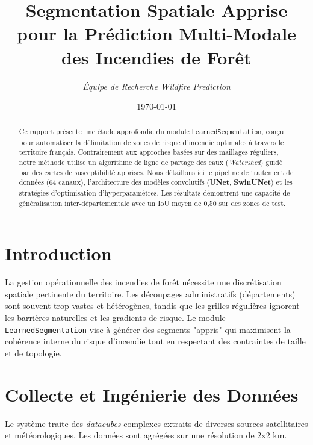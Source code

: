 \documentclass[11pt,a4paper]{article}
\title{\textbf{Segmentation Spatiale Apprise pour la Prédiction Multi-Modale des Incendies de Forêt}}
\author{\textit{Équipe de Recherche Wildfire Prediction}}
\date{\today}
\begin{document}
\maketitle

\begin{abstract}
Ce rapport présente une étude approfondie du module \texttt{LearnedSegmentation}, conçu pour automatiser la délimitation de zones de risque d'incendie optimales à travers le territoire français. Contrairement aux approches basées sur des maillages réguliers, notre méthode utilise un algorithme de ligne de partage des eaux (\textit{Watershed}) guidé par des cartes de susceptibilité apprises. Nous détaillons ici le pipeline de traitement de données (64 canaux), l'architecture des modèles convolutifs (\textbf{UNet}, \textbf{SwinUNet}) et les stratégies d'optimisation d'hyperparamètres. Les résultats démontrent une capacité de généralisation inter-départementale avec un IoU moyen de 0,50 sur des zones de test.
\end{abstract}

\section{Introduction}
La gestion opérationnelle des incendies de forêt nécessite une discrétisation spatiale pertinente du territoire. Les découpages administratifs (départements) sont souvent trop vastes et hétérogènes, tandis que les grilles régulières ignorent les barrières naturelles et les gradients de risque. Le module \texttt{LearnedSegmentation} vise à générer des segments "appris" qui maximisent la cohérence interne du risque d'incendie tout en respectant des contraintes de taille et de topologie.

\section{Collecte et Ingénierie des Données}
Le système traite des \textit{datacubes} complexes extraits de diverses sources satellitaires et météorologiques. Les données sont agrégées sur une résolution de 2x2 km.
\end{document}
